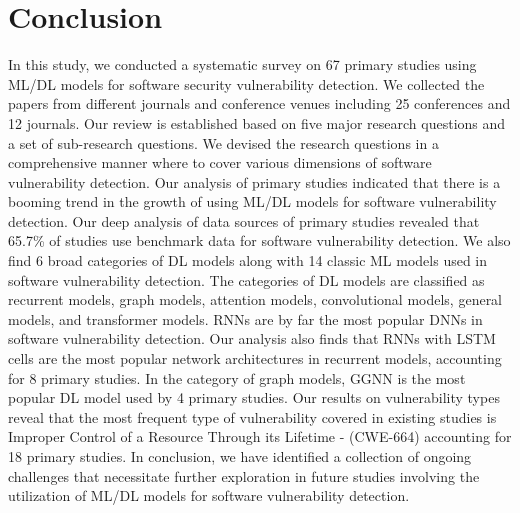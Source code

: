 \section{Conclusion}
In this study, we conducted a systematic survey on 67 primary studies using ML/DL models for software security vulnerability detection. We collected the papers from different journals and conference venues including 25 conferences and 12 journals. Our review is established based on five major research questions and a set of sub-research questions. We devised the research questions in a comprehensive manner where to cover various dimensions of software vulnerability detection. Our analysis of primary studies indicated that there is a booming trend in the growth of using ML/DL models for software vulnerability detection. Our deep analysis of data sources of primary studies revealed that 65.7\% of studies use benchmark data for software vulnerability detection. We also find 6 broad categories of DL models along with 14 classic ML models used in software vulnerability detection. The categories of DL models are classified as recurrent models, graph models, attention models, convolutional models, general models, and transformer models. RNNs are by far the most popular DNNs in software vulnerability detection. Our analysis also finds that RNNs with LSTM cells are the most popular network architectures in recurrent models, accounting for 8 primary studies. In the category of graph models, GGNN is the most popular DL model used by 4 primary studies. Our results on vulnerability types reveal that the most frequent type of vulnerability covered in existing studies is Improper Control of a Resource Through its Lifetime - (CWE-664) accounting for 18 primary studies. In conclusion, we have identified a collection of ongoing challenges that necessitate further exploration in future studies involving the utilization of ML/DL models for software vulnerability detection.